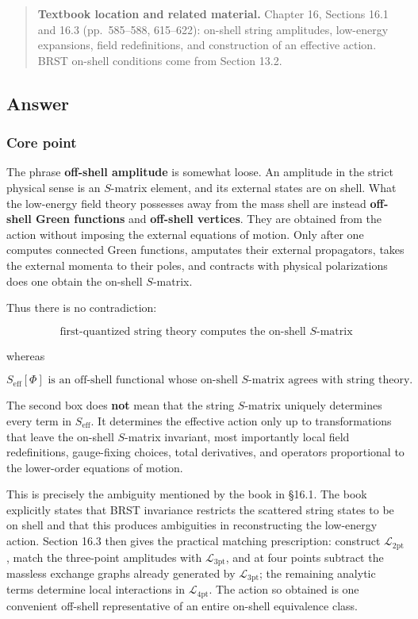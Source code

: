 \documentclass[
  10pt,
  a4paper,
  openany]{book}
\begin{document}
\begin{quote}
\textbf{Textbook location and related material.} Chapter 16, Sections
16.1 and 16.3 (pp.~585--588, 615--622): on-shell string amplitudes,
low-energy expansions, field redefinitions, and construction of an
effective action. BRST on-shell conditions come from Section 13.2.
\end{quote}

\subsection{Answer}\label{answer-30}

\subsubsection{Core point}\label{core-point-30}

The phrase \textbf{off-shell amplitude} is somewhat loose. An amplitude
in the strict physical sense is an \(S\)-matrix element, and its
external states are on shell. What the low-energy field theory possesses
away from the mass shell are instead \textbf{off-shell Green functions}
and \textbf{off-shell vertices}. They are obtained from the action
without imposing the external equations of motion. Only after one
computes connected Green functions, amputates their external
propagators, takes the external momenta to their poles, and contracts
with physical polarizations does one obtain the on-shell \(S\)-matrix.

Thus there is no contradiction:

\[
\boxed{
\text{first-quantized string theory computes the on-shell }S\text{-matrix}
}
\]

whereas

\[
\boxed{
S_{\mathrm{eff}}[\Phi]\text{ is an off-shell functional whose on-shell }S\text{-matrix agrees with string theory.}
}
\]

The second box does \textbf{not} mean that the string \(S\)-matrix
uniquely determines every term in \(S_{\mathrm{eff}}\). It determines
the effective action only up to transformations that leave the on-shell
\(S\)-matrix invariant, most importantly local field redefinitions,
gauge-fixing choices, total derivatives, and operators proportional to
the lower-order equations of motion.

This is precisely the ambiguity mentioned by the book in §16.1. The book
explicitly states that BRST invariance restricts the scattered string
states to be on shell and that this produces ambiguities in
reconstructing the low-energy action. Section 16.3 then gives the
practical matching prescription: construct
\(\mathcal L_{2\mathrm{pt}}\), match the three-point amplitudes with
\(\mathcal L_{3\mathrm{pt}}\), and at four points subtract the massless
exchange graphs already generated by \(\mathcal L_{3\mathrm{pt}}\); the
remaining analytic terms determine local interactions in
\(\mathcal L_{4\mathrm{pt}}\). The action so obtained is one convenient
off-shell representative of an entire on-shell equivalence class.
\end{document}
